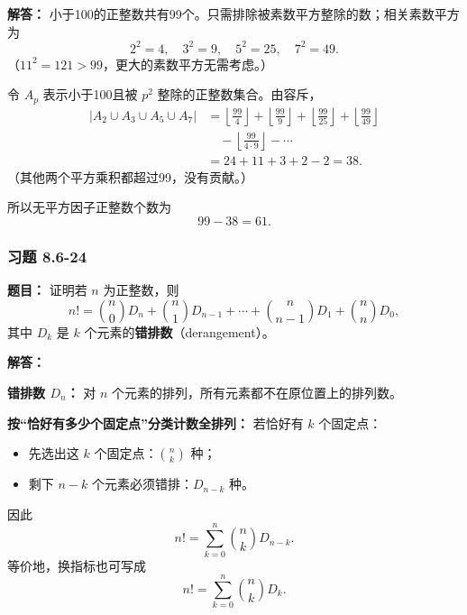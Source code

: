 \documentclass[11pt,UTF8]{article}
\begin{document}
\textbf{解答：} 小于100的正整数共有99个。只需排除被素数平方整除的数；相关素数平方为
\[ 2^2=4,\quad 3^2=9,\quad 5^2=25,\quad 7^2=49. \]
（$11^2=121>99$，更大的素数平方无需考虑。）

令 $A_p$ 表示小于100且被 $p^2$ 整除的正整数集合。由容斥，
\begin{align*}
|A_2\cup A_3\cup A_5\cup A_7| &= \left\lfloor\frac{99}{4}\right\rfloor+\left\lfloor\frac{99}{9}\right\rfloor+\left\lfloor\frac{99}{25}\right\rfloor+\left\lfloor\frac{99}{49}\right\rfloor\\
&\quad-\left\lfloor\frac{99}{4\cdot 9}\right\rfloor-\cdots\\
&= 24+11+3+2-2=38.
\end{align*}
（其他两个平方乘积都超过99，没有贡献。）

所以无平方因子正整数个数为
\[ \boxed{99-38=61}. \]

\subsubsection*{习题 8.6-24}
\textbf{题目：} 证明若 $n$ 为正整数，则
\[ n!=\binom{n}{0}D_n+\binom{n}{1}D_{n-1}+\cdots+\binom{n}{n-1}D_1+\binom{n}{n}D_0, \]
其中 $D_k$ 是 $k$ 个元素的\textbf{错排数}（derangement）。

\textbf{解答：}

\textbf{错排数 $D_n$：} 对 $n$ 个元素的排列，所有元素都不在原位置上的排列数。

\textbf{按``恰好有多少个固定点''分类计数全排列：} 若恰好有 $k$ 个固定点：
\begin{itemize}
    \item 先选出这 $k$ 个固定点：$\displaystyle\binom{n}{k}$ 种；
    \item 剩下 $n-k$ 个元素必须错排：$D_{n-k}$ 种。
\end{itemize}
因此
\[ \boxed{n!=\sum_{k=0}^{n}\binom{n}{k}D_{n-k}.} \]
等价地，换指标也可写成
\[ n!=\sum_{k=0}^{n}\binom{n}{k}D_k. \]
\end{document}

